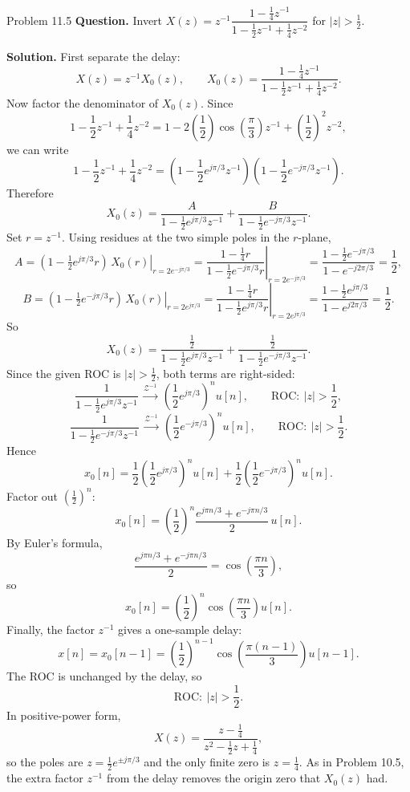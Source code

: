 \documentclass[10pt]{article}
\newcommand{\ROC}{\mathrm{ROC}}
\newcommand{\ZT}{\mathcal{Z}}
\newcommand{\Prompt}[1]{\textbf{Question.} #1}
\newcommand{\SketchLabel}{\tcblower\textbf{Solution.}}
\newcommand{\Zinvpair}[2]{#1\,\mathrel{\overset{\ZT^{-1}}{\longrightarrow}}\,#2}
\begin{document}
\begin{examplebox}{Problem 11.5}
  \Prompt{Invert \(X(z)=z^{-1}\dfrac{1-\frac14 z^{-1}}{1-\frac12 z^{-1}+\frac14 z^{-2}}\) for \(|z|>\frac12\).}

  \medskip
  \SketchLabel{}
  First separate the delay:
  \[
    X(z)=z^{-1}X_0(z),
    \qquad
    X_0(z)=\frac{1-\frac14 z^{-1}}{1-\frac12 z^{-1}+\frac14 z^{-2}}.
  \]
  Now factor the denominator of \(X_0(z)\). Since
  \[
    1-\frac12 z^{-1}+\frac14 z^{-2}
    =1-2\left(\frac12\right)\cos\!\left(\frac{\pi}{3}\right)z^{-1}
    +\left(\frac12\right)^2 z^{-2},
  \]
  we can write
  \[
    1-\frac12 z^{-1}+\frac14 z^{-2}
    =\left(1-\frac12 e^{j\pi/3}z^{-1}\right)\left(1-\frac12 e^{-j\pi/3}z^{-1}\right).
  \]
  Therefore
  \[
    X_0(z)=\frac{A}{1-\frac12 e^{j\pi/3}z^{-1}}
    +\frac{B}{1-\frac12 e^{-j\pi/3}z^{-1}}.
  \]
  Set \(r=z^{-1}\). Using residues at the two simple poles in the \(r\)-plane,
  \[
    A=\left.(1-\tfrac12 e^{j\pi/3}r)\,X_0(r)\right|_{r=2e^{-j\pi/3}}
    =\left.\frac{1-\frac14 r}{1-\frac12 e^{-j\pi/3}r}\right|_{r=2e^{-j\pi/3}}
    =\frac{1-\frac12 e^{-j\pi/3}}{1-e^{-j2\pi/3}}
    =\frac12,
  \]
  \[
    B=\left.(1-\tfrac12 e^{-j\pi/3}r)\,X_0(r)\right|_{r=2e^{j\pi/3}}
    =\left.\frac{1-\frac14 r}{1-\frac12 e^{j\pi/3}r}\right|_{r=2e^{j\pi/3}}
    =\frac{1-\frac12 e^{j\pi/3}}{1-e^{j2\pi/3}}
    =\frac12.
  \]
  So
  \[
    X_0(z)=\frac{\frac12}{1-\frac12 e^{j\pi/3}z^{-1}}
    +\frac{\frac12}{1-\frac12 e^{-j\pi/3}z^{-1}}.
  \]
  Since the given ROC is \(|z|>\frac12\), both terms are right-sided:
  \[
    \Zinvpair{\frac{1}{1-\frac12 e^{j\pi/3}z^{-1}}}{\left(\frac12 e^{j\pi/3}\right)^n u[n]},
    \qquad
    \ROC:\ |z|>\frac12,
  \]
  \[
    \Zinvpair{\frac{1}{1-\frac12 e^{-j\pi/3}z^{-1}}}{\left(\frac12 e^{-j\pi/3}\right)^n u[n]},
    \qquad
    \ROC:\ |z|>\frac12.
  \]
  Hence
  \[
    x_0[n]
    =\frac12\left(\frac12 e^{j\pi/3}\right)^n u[n]
    +\frac12\left(\frac12 e^{-j\pi/3}\right)^n u[n].
  \]
  Factor out \(\left(\frac12\right)^n\):
  \[
    x_0[n]
    =\left(\frac12\right)^n
    \frac{e^{j\pi n/3}+e^{-j\pi n/3}}{2}\,u[n].
  \]
  By Euler's formula,
  \[
    \frac{e^{j\pi n/3}+e^{-j\pi n/3}}{2}
    =\cos\!\left(\frac{\pi n}{3}\right),
  \]
  so
  \[
    x_0[n]=\left(\frac12\right)^n\cos\!\left(\frac{\pi n}{3}\right)u[n].
  \]
  Finally, the factor \(z^{-1}\) gives a one-sample delay:
  \[
    x[n]=x_0[n-1]
    =\left(\frac12\right)^{n-1}\cos\!\left(\frac{\pi(n-1)}{3}\right)u[n-1].
  \]
  The ROC is unchanged by the delay, so
  \[
    \ROC:\ |z|>\frac12.
  \]
  In positive-power form,
  \[
    X(z)=\frac{z-\frac14}{z^2-\frac12 z+\frac14},
  \]
  so the poles are \(z=\frac12 e^{\pm j\pi/3}\) and the only finite zero is \(z=\frac14\).
  As in Problem 10.5, the extra factor \(z^{-1}\) from the delay removes the origin zero that \(X_0(z)\) had.


\end{examplebox}
\end{document}
